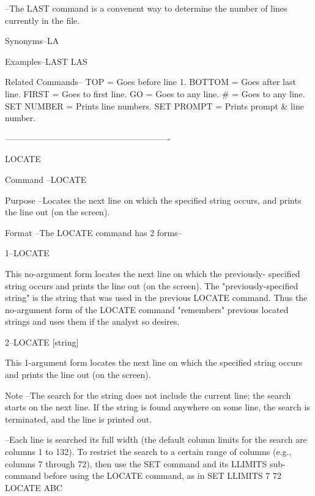         --The LAST command is a convenent way to
          determine the number of lines currently
          in the file.
 
Synonyms--LA
 
Examples--LAST
          LAS
 
Related Commands--
          TOP             = Goes before line 1.
          BOTTOM          = Goes after last line.
          FIRST           = Goes to first line.
          GO              = Goes to any line.
          #               = Goes to any line.
          SET NUMBER      = Prints line numbers.
          SET PROMPT      = Prints prompt & line number.
 
----------------------------------------------------------
 
LOCATE
 
Command --LOCATE
 
Purpose --Locates the next line on which
          the specified string occurs, and
          prints the line out (on the screen).
 
Format  --The LOCATE command has 2 forms--
 
       1--LOCATE
 
          This no-argument form locates the
          next line on which the previously-
          specified string occurs and
          prints the line out (on the screen).
          The "previously-specified string" is
          the string that was used in the
          previous LOCATE command.  Thus the
          no-argument form of the LOCATE command
          "remembers" previous located strings
          and uses them if the analyst so desires.
 
       2--LOCATE     [string]
 
          This 1-argument form locates the
          next line on which the specified
          string occurs and prints the line
          out (on the screen).
 
Note    --The search for the string
          does not include the current line;
          the search starts on the next line.
          If the string is found anywhere on
          some line, the search is terminated,
          and the line is printed out.
 
        --Each line is searched its full width
          (the default column limits for the search
          are columns 1 to 132).
          To restrict the search to a certain range  of
          columns (e.g., columns 7 through 72), then
          use the SET command and its LLIMITS sub-command
          before using the LOCATE command, as in
             SET LLIMITS 7 72
             LOCATE ABC
 
